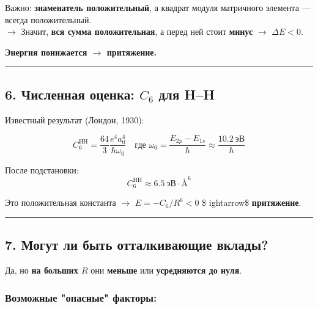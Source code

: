 \documentclass[11pt]{article}
\begin{document}
Важно: \textbf{знаменатель положительный}, а квадрат модуля матричного
элемента --- всегда положительный.\\
$\rightarrow$ Значит, \textbf{вся сумма положительная}, а перед ней
стоит \textbf{минус} $\rightarrow$ \(\Delta E < 0\).

\textbf{Энергия понижается $\rightarrow$ притяжение.}

\begin{center}\rule{0.5\linewidth}{\linethickness}\end{center}

\subsection{\texorpdfstring{6. Численная оценка: \(C_6\) для
H--H}{6. Численная оценка: C\_6 для H--H}}\label{ux447ux438ux441ux43bux435ux43dux43dux430ux44f-ux43eux446ux435ux43dux43aux430-c_6-ux434ux43bux44f-hh}

Известный результат (Лондон, 1930):

\[
C_6^{\text{HH}} = \frac{64}{3} \frac{e^4 a_0^4}{\hbar \omega_0}
\quad \text{где } \omega_0 = \frac{E_{2p} - E_{1s}}{\hbar} \approx \frac{10.2~\text{эВ}}{\hbar}
\]

После подстановки: \[
C_6^{\text{HH}} \approx 6.5~\text{эВ} \cdot \text{Å}^6
\]

Это положительная константа $\rightarrow$ \(E = -C_6/R^6 < 0\) \$
ightarrow\$ \textbf{притяжение}.

\begin{center}\rule{0.5\linewidth}{\linethickness}\end{center}

\subsection{7. Могут ли быть отталкивающие
вклады?}\label{ux43cux43eux433ux443ux442-ux43bux438-ux431ux44bux442ux44c-ux43eux442ux442ux430ux43bux43aux438ux432ux430ux44eux449ux438ux435-ux432ux43aux43bux430ux434ux44b}

Да, но \textbf{на больших \(R\)} они \textbf{меньше} или
\textbf{усредняются до нуля}.

\subsubsection{Возможные "опасные"
факторы:}\label{ux432ux43eux437ux43cux43eux436ux43dux44bux435-ux43eux43fux430ux441ux43dux44bux435-ux444ux430ux43aux442ux43eux440ux44b}
\end{document}

